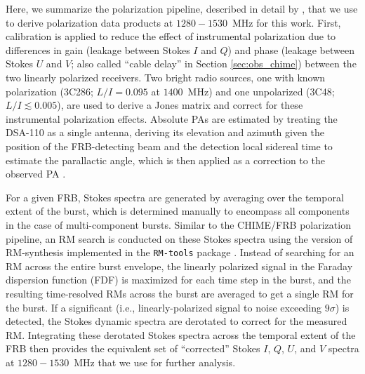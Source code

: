 \documentclass[twocolumn, linenumbers]{aastex701}
\begin{document}
Here, we summarize the polarization pipeline, described in detail by \cite{Sherman_2024_ApJ}, that we use to derive polarization data products at $1280-1530$~MHz for this work. First, calibration is applied to reduce the effect of instrumental polarization due to differences in gain (leakage between Stokes $I$ and $Q$) and phase (leakage between Stokes $U$ and $V$; also called ``cable delay'' in Section \ref{sec:obs_chime}) between the two linearly polarized receivers. Two bright radio sources, one with known polarization (3C286; $L/I = 0.095$ at $1400$~MHz) and one unpolarized (3C48; $L/I \lesssim 0.005$), are used to derive a Jones matrix and correct for these instrumental polarization effects. Absolute PAs are estimated by treating the DSA-110 as a single antenna, deriving its elevation and azimuth given the position of the FRB-detecting beam and the detection local sidereal time to estimate the parallactic angle, which is then applied as a correction to the observed PA \citep[for further details regarding the polarization calibration, see Appendices D$-$G by][]{Sherman_2024_ApJ}.

For a given FRB, Stokes spectra are generated by averaging over the temporal extent of the burst, which is determined manually to encompass all components in the case of multi-component bursts. Similar to the CHIME/FRB polarization pipeline, an RM search is conducted on these Stokes spectra using the version of RM-synthesis implemented in the {\tt RM-tools} package \citep{2005A&A...441.1217B, 2020ascl.soft05003P, 2026arXiv260120092V}. Instead of searching for an RM across the entire burst envelope, the linearly polarized signal in the Faraday dispersion function (FDF) is maximized for each time step in the burst, and the resulting time-resolved RMs across the burst are averaged to get a single RM for the burst. If a significant (i.e., linearly-polarized signal to noise exceeding $9\sigma$) is detected, the Stokes dynamic spectra are derotated to correct for the measured RM. Integrating these derotated Stokes spectra across the temporal extent of the FRB then provides the equivalent set of ``corrected'' Stokes $I$, $Q$, $U$, and $V$ spectra at $1280-1530$~MHz that we use for further analysis.
\end{document}

